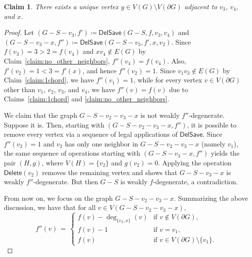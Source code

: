 \documentclass[11pt]{article}
\theoremstyle{slantthm}
\newtheorem{claim}{Claim}%
\numberwithin{equation}{section}
\theoremstyle{definition}
\newcommand{\defeq}{\coloneqq}
\numberwithin{equation}{section}
\newcommand{\0}{\varnothing}
\newcommand{\set}[1]{\{#1\}}
\newcommand{\del}{\mathsf{Delete}}
\newcommand{\delsave}{\mathsf{DelSave}}
\newcommand{\bdry}[1]{{\partial #1}}
\begin{document}
    \begin{claim}\label{claim:y}
        There exists a unique vertex $y \in V(G) \setminus V(\bdry{G})$ adjacent to $v_3$, $v_4$, and $x$.
    \end{claim}
    \begin{proof}
        Let $(G - S - v_3, f') \defeq \delsave(G-S, f, v_3,v_4)$ and $(G - S - v_3 - x,f'') \defeq \delsave(G -S - v_3, f', x, v_2)$. Since $f(v_3) = 3 > 2 = f(v_4)$ and $xv_4 \notin E(G)$ by Claim~\ref{claim:no_other_neighbors}, $f''(v_4) = f(v_4)$. Also, $f'(v_2) = 1 < 3 = f'(x)$, and hence $f''(v_2) = 1$. Since $v_1 v_3 \notin E(G)$ by Claim~\ref{claim:1chord}, we have $f''(v_1) = 1$, while for every vertex $v \in V(\bdry{G})$ other than $v_1$, $v_2$, $v_3$, and $v_4$, we have $f''(v) = f(v)$ due to Claims~\ref{claim:1chord} and \ref{claim:no_other_neighbors}.
        
        We claim that the graph $G - S - v_2 - v_3 - x$ is not weakly $f''$-degenerate. Suppose it is. Then, starting with $(G - S - v_2 - v_3 - x, f'')$, it is possible to remove every vertex via a sequence of legal applications of $\delsave$. Since $f''(v_2) = 1$ and $v_2$ has only one neighbor in $G - S - v_2 -v_3 - x$ (namely $v_1$), the same sequence of operations starting with $(G - S - v_3 - x, f'')$ yields the pair $(H, g)$, where $V(H) = \set{v_2}$ and $g(v_2) = 0$. Applying the operation $\del(v_2)$ removes the remaining vertex and shows that $G - S - v_3 - x$ is weakly $f''$-degenerate. But then $G - S$ is weakly $f$-degenerate, a contradiction.

        From now on, we focus on the graph $G - S - v_2 - v_3 - x$. Summarizing the above discussion, we have that for all $v \in V(G - S - v_2 - v_3 - x)$,
        \[
        f''(v) \,=\, \begin{cases}
                    f(v) - \deg_{\set{v_3, x}}(v) &\text{if } v \notin V(\bdry{G}),\\
                    f(v) - 1 &\text{if } v = v_1,\\
                    f(v) &\text{if } v \in V(\bdry{G}) \setminus \set{v_1}.
                    \end{cases}
        \]
        

\end{proof}
\end{document}
